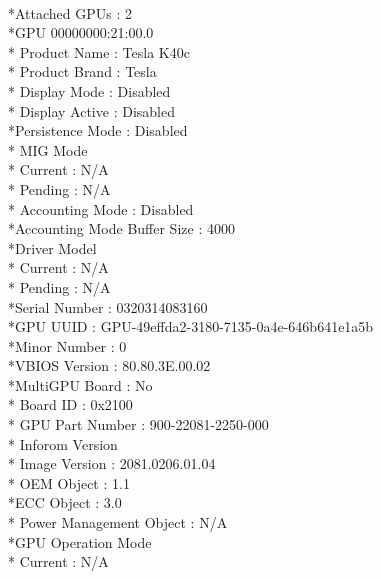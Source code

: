 \documentclass{article}
\begin{document}
 \\*Attached GPUs                             : 2
 \\*GPU 00000000:21:00.0
    \\* Product Name                          : Tesla K40c
    \\* Product Brand                         : Tesla
    \\* Display Mode                          : Disabled
    \\* Display Active                        : Disabled
     \\*Persistence Mode                      : Disabled
    \\* MIG Mode
        \\* Current                           : N/A
        \\* Pending                           : N/A
    \\* Accounting Mode                       : Disabled
     \\*Accounting Mode Buffer Size           : 4000
     \\*Driver Model
        \\* Current                           : N/A
        \\* Pending                           : N/A
     \\*Serial Number                         : 0320314083160
     \\*GPU UUID                              : GPU-49effda2-3180-7135-0a4e-646b641e1a5b
     \\*Minor Number                          : 0
     \\*VBIOS Version                         : 80.80.3E.00.02
     \\*MultiGPU Board                        : No
    \\* Board ID                              : 0x2100
    \\* GPU Part Number                       : 900-22081-2250-000
    \\* Inforom Version
        \\* Image Version                     : 2081.0206.01.04
        \\* OEM Object                        : 1.1
         \\*ECC Object                        : 3.0
        \\* Power Management Object           : N/A
     \\*GPU Operation Mode
        \\* Current                           : N/A
\end{document}
